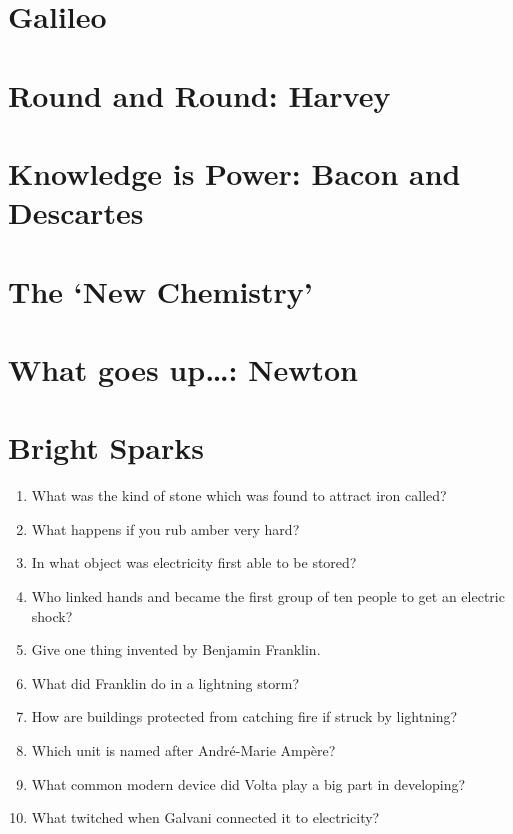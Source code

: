 \documentclass[a4paper,11pt]{article}
\begin{document}
\section{Galileo}

\section{Round and Round: Harvey}

\section{Knowledge is Power: Bacon and Descartes}

\section{The `New Chemistry'}

\section{What goes up\ldots: Newton}

\section{Bright Sparks}

\begin{enumerate}
    \item What was the kind of stone which was found to attract iron called?
    \item What happens if you rub amber very hard?
    \item In what object was electricity first able to be stored?
    \item Who linked hands and became the first group of ten people to get an electric shock?
    \item Give one thing invented by Benjamin Franklin.
    \item What did Franklin do in a lightning storm?
    \item How are buildings protected from catching fire if struck by lightning?
    \item Which unit is named after Andr\'e-Marie Amp\`ere?
    \item What common modern device did Volta play a big part in developing?
    \item What twitched when Galvani connected it to electricity?
\end{enumerate}
\end{document}
